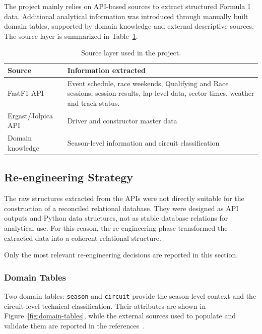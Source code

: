 \documentclass[11pt,a4paper]{article}
\begin{document}
	The project mainly relies on API-based sources to extract structured Formula 1 data. 
	Additional analytical information was introduced through manually built domain tables, supported by domain knowledge and external descriptive sources. 
	The source layer is summarized in Table~\ref{tab:sources}.

	\begin{table}[H]
		\centering
		\caption{Source layer used in the project.}
		\label{tab:sources}
		\begin{tabularx}{\linewidth}{p{5cm}X}
			\toprule
			\textbf{Source} & \textbf{Information extracted} \\
			\toprule
			FastF1 API~\cite{fastf1docs} 
			& Event schedule, race weekends, Qualifying and Race sessions, session results, lap-level data, sector times, weather and track status. \\
			\midrule
			Ergast/Jolpica API~\cite{jolpicaDocs} 
			& Driver and constructor master data \\
			\midrule
		
			Domain knowledge 
			& Season-level information and circuit classification \\
			\bottomrule
		\end{tabularx}
	\end{table}

	

	\subsection{Re-engineering Strategy}
	
	The raw structures extracted from the APIs were not directly suitable for the construction of a reconciled relational database. 
	They were designed as API outputs and Python data structures, not as stable database relations for analytical use. 
	For this reason, the re-engineering phase transformed the extracted data into a coherent relational structure.
	
	Only the most relevant re-engineering decisions are reported in this section. 


	\subsubsection{Domain Tables}
	
	Two domain tables: \texttt{season} and \texttt{circuit} provide the season-level context and the circuit-level technical classification.
	Their attributes are shown in Figure~\ref{fig:domain-tables}, while the external sources used to populate and validate them are reported in the references~\cite{f1calendars,f1standings,formulaTimerCircuits}.
\end{document}
